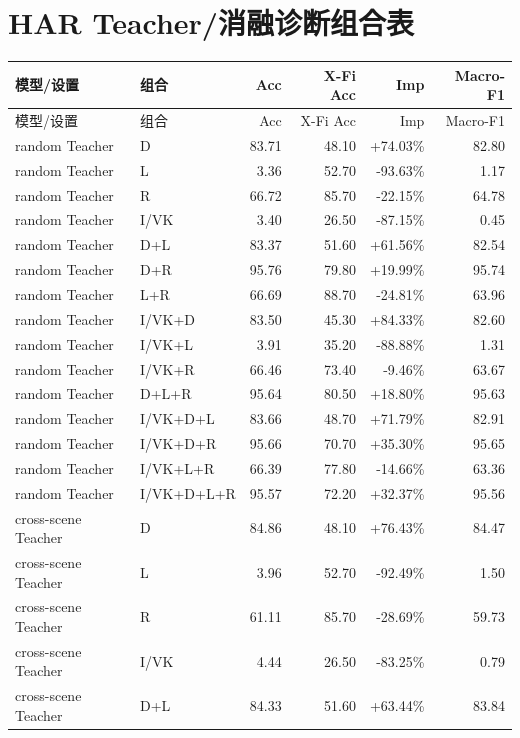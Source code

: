 \documentclass[UTF8,10pt]{ctexart}
\newcommand{\better}[1]{\textcolor{goodblue}{#1}}
\newcommand{\worse}[1]{\textcolor{badred}{#1}}
\begin{document}
\section{HAR Teacher/消融诊断组合表}
{\tiny
\begin{longtable}{llrrrr}
\toprule
模型/设置 & 组合 & Acc & X-Fi Acc & Imp & Macro-F1\\
\midrule
\endfirsthead
\toprule
模型/设置 & 组合 & Acc & X-Fi Acc & Imp & Macro-F1\\
\midrule
\endhead
random Teacher & D & 83.71 & 48.10 & \better{+74.03\%} & 82.80\\
random Teacher & L & 3.36 & 52.70 & \worse{-93.63\%} & 1.17\\
random Teacher & R & 66.72 & 85.70 & \worse{-22.15\%} & 64.78\\
random Teacher & I/VK & 3.40 & 26.50 & \worse{-87.15\%} & 0.45\\
random Teacher & D+L & 83.37 & 51.60 & \better{+61.56\%} & 82.54\\
random Teacher & D+R & 95.76 & 79.80 & \better{+19.99\%} & 95.74\\
random Teacher & L+R & 66.69 & 88.70 & \worse{-24.81\%} & 63.96\\
random Teacher & I/VK+D & 83.50 & 45.30 & \better{+84.33\%} & 82.60\\
random Teacher & I/VK+L & 3.91 & 35.20 & \worse{-88.88\%} & 1.31\\
random Teacher & I/VK+R & 66.46 & 73.40 & \worse{-9.46\%} & 63.67\\
random Teacher & D+L+R & 95.64 & 80.50 & \better{+18.80\%} & 95.63\\
random Teacher & I/VK+D+L & 83.66 & 48.70 & \better{+71.79\%} & 82.91\\
random Teacher & I/VK+D+R & 95.66 & 70.70 & \better{+35.30\%} & 95.65\\
random Teacher & I/VK+L+R & 66.39 & 77.80 & \worse{-14.66\%} & 63.36\\
random Teacher & I/VK+D+L+R & 95.57 & 72.20 & \better{+32.37\%} & 95.56\\
cross-scene Teacher & D & 84.86 & 48.10 & \better{+76.43\%} & 84.47\\
cross-scene Teacher & L & 3.96 & 52.70 & \worse{-92.49\%} & 1.50\\
cross-scene Teacher & R & 61.11 & 85.70 & \worse{-28.69\%} & 59.73\\
cross-scene Teacher & I/VK & 4.44 & 26.50 & \worse{-83.25\%} & 0.79\\
cross-scene Teacher & D+L & 84.33 & 51.60 & \better{+63.44\%} & 83.84\\

\end{longtable}}
\end{document}

